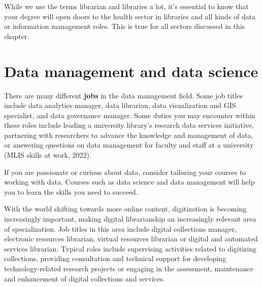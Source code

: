 \documentclass[
  letterpaper,
  DIV=11,
  numbers=noendperiod]{scrreprt}
\begin{document}
\begin{tcolorbox}[enhanced jigsaw, arc=.35mm, bottomrule=.15mm, bottomtitle=1mm, breakable, colback=white, colbacktitle=quarto-callout-caution-color!10!white, colframe=quarto-callout-caution-color-frame, coltitle=black, left=2mm, leftrule=.75mm, opacityback=0, opacitybacktitle=0.6, rightrule=.15mm, title=\textcolor{quarto-callout-caution-color}{\faFire}\hspace{0.5em}{Beware}, titlerule=0mm, toprule=.15mm, toptitle=1mm]

While we use the terms librarian and libraries a lot, it's essential to
know that your degree will open doors to the health sector in libraries
and all kinds of data or information management roles. This is true for
all sectors discussed in this chapter.

\end{tcolorbox}

\section{Data management and data
science}\label{data-management-and-data-science}

There are many different \textbf{jobs} in the data management field.
Some job titles include data analytics manager, data librarian, data
visualization and GIS specialist, and data governance manager. Some
duties you may encounter within these roles include leading a university
library's research data services initiative, partnering with researchers
to advance the knowledge and management of data, or answering questions
on data management for faculty and staff at a university (MLIS skills at
work, 2022).

If you are passionate or curious about data, consider tailoring your
courses to working with data. Courses such as data science and data
management will help you to learn the skills you need to succeed.

With the world shifting towards more online content, digitization is
becoming increasingly important, making digital librarianship an
increasingly relevant area of specialization. Job titles in this area
include digital collections manager, electronic resources librarian,
virtual resources librarian or digital and automated services librarian.
Typical roles include supervising activities related to digitizing
collections, providing consultation and technical support for developing
technology-related research projects or engaging in the assessment,
maintenance and enhancement of digital collections and services.
\end{document}
